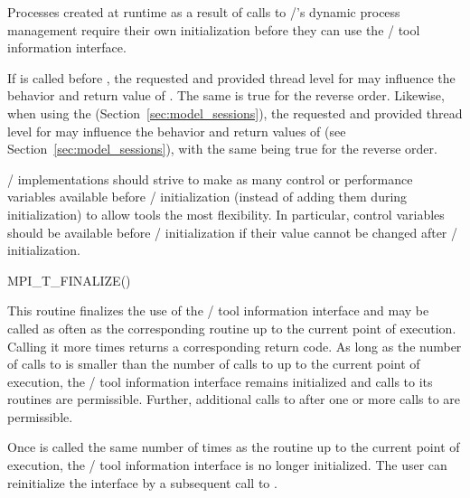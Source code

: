 Processes created at runtime as a result of calls to \MPI/'s dynamic
process management require their own initialization before they can use the
\MPI/ tool information interface.

\begin{users}
If  is called before
, the requested and provided thread level for
 may influence the behavior and return value
of .  The same is true for the reverse order.
Likewise, when using the \spm{} (Section~\ref{sec:model_sessions}), the requested
and provided thread level for  may influence
the behavior and return values of  (see Section~\ref{sec:model_sessions}), with the
same being true for the reverse order.
\end{users}

\begin{implementors}
\MPI/ implementations should strive to make as many control or performance
variables available before \MPI/ initialization (instead of adding them
during initialization) to allow tools the most flexibility.  In
particular, control variables should be available before
\MPI/ initialization if their value cannot be changed after
\MPI/ initialization.
\end{implementors}

\begin{funcdefna}{MPI\_T\_FINALIZE}{()}
\end{funcdefna}

This routine finalizes the use of the \MPI/ tool information interface and
may be called as often as the corresponding 
routine up to the current point of execution.  Calling it more times
returns a corresponding return code.  As long as the number of calls to
 is smaller than the number of calls to
 up to the current point of execution, the
\MPI/ tool information interface remains initialized and calls to its
routines are permissible.  Further, additional calls to
 after one or more calls to
 are permissible.

Once  is called the same number of times as the
routine  up to the current point of
execution, the \MPI/ tool information interface is no longer initialized.
The user can reinitialize the interface by a subsequent call
to .


